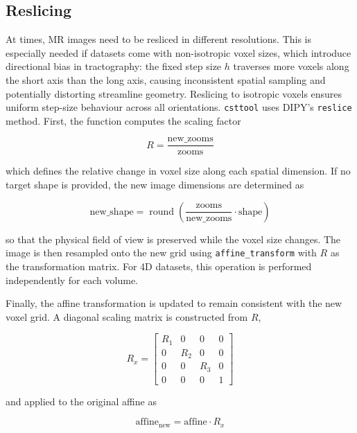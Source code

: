 \subsection{Reslicing}
\label{subsec:methods_reslicing}

At times, MR images need to be resliced in different resolutions. This is especially needed if datasets come with non-isotropic voxel sizes, which introduce directional bias in tractography: the fixed step size $h$ traverses more voxels along the short axis than the long axis, causing inconsistent spatial sampling and potentially distorting streamline geometry. Reslicing to isotropic voxels ensures uniform step-size behaviour across all orientations. \texttt{csttool} uses DIPY's \texttt{reslice} method. First, the function computes the scaling factor

\begin{equation}
	R = \frac{\text{new\_zooms}}{\text{zooms}}
\end{equation}

which defines the relative change in voxel size along each spatial dimension. If no target shape is provided, the new image dimensions are determined as

\begin{equation}
	\text{new\_shape} = \operatorname{round}\left(\frac{\text{zooms}}{\text{new\_zooms}} \cdot \text{shape}\right)
\end{equation}

so that the physical field of view is preserved while the voxel size changes. The image is then resampled onto the new grid using \texttt{affine\_transform} with \(R\) as the transformation matrix. For 4D datasets, this operation is performed independently for each volume.

Finally, the affine transformation is updated to remain consistent with the new voxel grid. A diagonal scaling matrix is constructed from \(R\),

\begin{equation}
	R_x =
	\begin{bmatrix}
		R_1 & 0 & 0 & 0 \\
		0 & R_2 & 0 & 0 \\
		0 & 0 & R_3 & 0 \\
		0 & 0 & 0 & 1
	\end{bmatrix}
\end{equation}

and applied to the original affine as

\begin{equation}
	\text{affine}_{\text{new}} = \text{affine} \cdot R_x
\end{equation}

